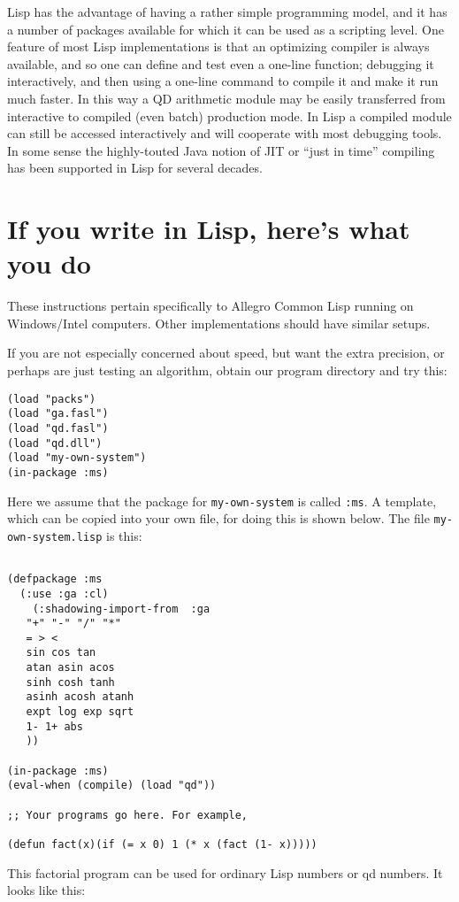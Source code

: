 \documentclass{article}
\begin{document}
Lisp has the advantage of having a rather simple programming model,
and it has a number of packages available for which it can be used as
a scripting level.  One feature of most Lisp implementations is that
an optimizing compiler is always available, and so one can define and
test even a one-line function; debugging it interactively, and then
using a one-line command to compile it and make it run much faster.
In this way a QD arithmetic module may be easily transferred from
interactive to compiled (even batch) production mode. In Lisp a
compiled module can still be accessed interactively and will cooperate
with most debugging tools.  In some sense the highly-touted Java
notion of JIT or ``just in time'' compiling has been supported in Lisp
for several decades.

\section{If you write in Lisp, here's what you do}

These instructions pertain specifically to Allegro Common Lisp running
on Windows/Intel computers.  Other implementations should have similar
setups.

If you are not especially concerned about speed, but want the
extra precision, or perhaps are just testing an algorithm,
obtain our program directory and try this:
\begin{verbatim}
(load "packs")
(load "ga.fasl")
(load "qd.fasl")
(load "qd.dll")
(load "my-own-system")
(in-package :ms)

\end{verbatim}

Here we assume that the package for {\tt my-own-system} is called {\tt :ms}.
A template, which can be copied into your own file,
for doing this is shown below.  The file {\tt my-own-system.lisp} is
this:
\begin{verbatim}

(defpackage :ms 
  (:use :ga :cl)
    (:shadowing-import-from  :ga
   "+" "-" "/" "*" 
   = > <  
   sin cos tan
   atan asin acos
   sinh cosh tanh
   asinh acosh atanh
   expt log exp sqrt
   1- 1+ abs
   ))

(in-package :ms)
(eval-when (compile) (load "qd"))

;; Your programs go here. For example,

(defun fact(x)(if (= x 0) 1 (* x (fact (1- x)))))

\end{verbatim}
This factorial program can be used for ordinary Lisp numbers or
qd numbers.  It looks like this:
\end{document}
